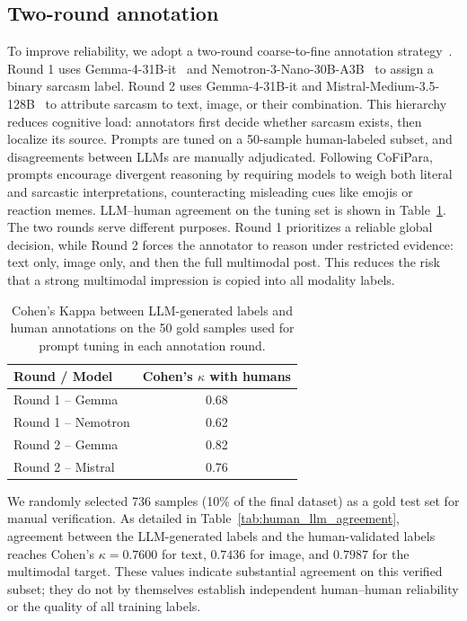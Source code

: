 \documentclass[conference]{IEEEtran}
\begin{document}
\subsection{Two-round annotation}
To improve reliability, we adopt a two-round coarse-to-fine annotation strategy~\cite{chen-etal-2024-cofipara}. Round 1 uses Gemma-4-31B-it~\cite{google2026gemma4} and Nemotron-3-Nano-30B-A3B~\cite{nvidia2025nvidianemotron3efficient} to assign a binary sarcasm label. Round 2 uses Gemma-4-31B-it and Mistral-Medium-3.5-128B~\cite{mistral2026medium35} to attribute sarcasm to text, image, or their combination. This hierarchy reduces cognitive load: annotators first decide whether sarcasm exists, then localize its source.
Prompts are tuned on a 50-sample human-labeled subset, and disagreements between LLMs are manually adjudicated. Following CoFiPara, prompts encourage divergent reasoning by requiring models to weigh both literal and sarcastic interpretations, counteracting misleading cues like emojis or reaction memes. LLM--human agreement on the tuning set is shown in Table~\ref{tab:llm-human-agreement}.
The two rounds serve different purposes. Round 1 prioritizes a reliable global decision, while Round 2 forces the annotator to reason under restricted evidence: text only, image only, and then the full multimodal post. This reduces the risk that a strong multimodal impression is copied into all modality labels.
\begin{table}[t]
\centering
\footnotesize
\setlength{\tabcolsep}{4pt}
\begin{tabular}{lc}          %
\toprule
\textbf{Round / Model} & \textbf{Cohen's $\kappa$ with humans} \\
\midrule
Round 1 -- Gemma & 0.68 \\
Round 1 -- Nemotron & 0.62 \\
\midrule
Round 2 -- Gemma  & 0.82 \\
Round 2 -- Mistral & 0.76 \\
\bottomrule
\end{tabular}
\caption{Cohen's Kappa between LLM-generated labels and human annotations on the 50 gold samples used for prompt tuning in each annotation round.}
\label{tab:llm-human-agreement}
\end{table}
\noindent We randomly selected 736 samples (10\% of the final dataset) as a gold test set for manual verification. As detailed in Table~\ref{tab:human_llm_agreement}, agreement between the LLM-generated labels and the human-validated labels reaches Cohen's $\kappa=0.7600$ for text, $0.7436$ for image, and $0.7987$ for the multimodal target. These values indicate substantial agreement on this verified subset; they do not by themselves establish independent human--human reliability or the quality of all training labels.
\end{document}
